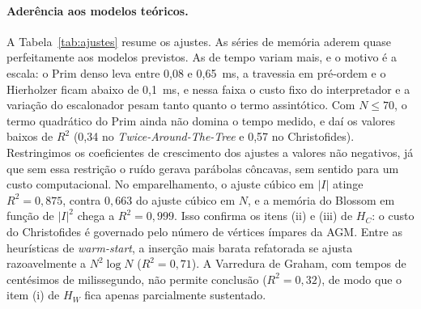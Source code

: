 \paragraph{Aderência aos modelos teóricos.}
A Tabela~\ref{tab:ajustes} resume os ajustes. As séries de memória aderem quase perfeitamente
aos modelos previstos. As de tempo variam mais, e o motivo é a escala: o Prim denso leva entre
0,08 e 0,65~ms, a travessia em pré-ordem e o Hierholzer ficam abaixo de 0,1~ms, e nessa faixa
o custo fixo do interpretador e a variação do escalonador pesam tanto quanto o termo
assintótico. Com $N \le 70$, o termo quadrático do Prim ainda não domina o tempo medido, e daí
os valores baixos de $R^2$ (0,34 no \textit{Twice-Around-The-Tree} e 0,57 no Christofides).
Restringimos os coeficientes de crescimento dos ajustes a valores não negativos, já que sem
essa restrição o ruído gerava parábolas côncavas, sem sentido para um custo computacional. No
emparelhamento, o ajuste cúbico em $|I|$ atinge $R^2 = 0{,}875$, contra $0{,}663$ do ajuste
cúbico em $N$, e a memória do Blossom em função de $|I|^2$ chega a $R^2 = 0{,}999$. Isso confirma os itens (ii) e (iii) de
$H_C$: o custo do Christofides é governado pelo número de vértices ímpares da AGM. Entre as
heurísticas de \textit{warm-start}, a inserção mais barata refatorada se ajusta razoavelmente a
$N^2 \log N$ ($R^2 = 0{,}71$). A Varredura de Graham, com tempos de centésimos de milissegundo,
não permite conclusão ($R^2 = 0{,}32$), de modo que o item (i) de $H_W$ fica apenas
parcialmente sustentado.

